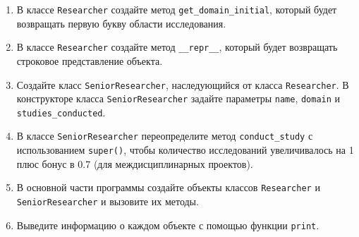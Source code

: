 \begin{enumerate}
\begin{enumerate}
    \item В классе \texttt{Researcher} создайте метод \texttt{get\_domain\_initial}, который будет возвращать первую букву области исследования.
    
    \item В классе \texttt{Researcher} создайте метод \texttt{\_\_repr\_\_}, который будет возвращать строковое представление объекта.
    
    \item Создайте класс \texttt{SeniorResearcher}, наследующийся от класса \texttt{Researcher}. В конструкторе класса \texttt{SeniorResearcher} задайте параметры \texttt{name}, \texttt{domain} и \texttt{studies\_conducted}.
    
    \item В классе \texttt{SeniorResearcher} переопределите метод \texttt{conduct\_study} с использованием \texttt{super()}, чтобы количество исследований увеличивалось на 1 плюс бонус в 0.7 (для междисциплинарных проектов).
    
    \item В основной части программы создайте объекты классов \texttt{Researcher} и \texttt{SeniorResearcher} и вызовите их методы.
    
    \item Выведите информацию о каждом объекте с помощью функции \texttt{print}.
\end{enumerate}
\end{enumerate}